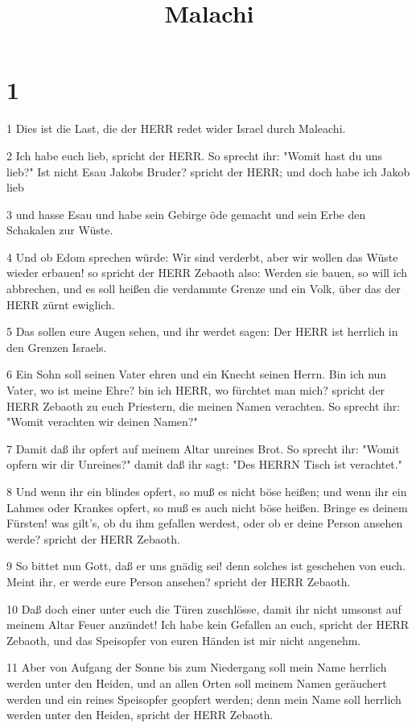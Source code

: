 

\title{Malachi}


\chapter{1}

\par 1 Dies ist die Last, die der HERR redet wider Israel durch Maleachi.
\par 2 Ich habe euch lieb, spricht der HERR. So sprecht ihr: "Womit hast du uns lieb?" Ist nicht Esau Jakobs Bruder? spricht der HERR; und doch habe ich Jakob lieb
\par 3 und hasse Esau und habe sein Gebirge öde gemacht und sein Erbe den Schakalen zur Wüste.
\par 4 Und ob Edom sprechen würde: Wir sind verderbt, aber wir wollen das Wüste wieder erbauen! so spricht der HERR Zebaoth also: Werden sie bauen, so will ich abbrechen, und es soll heißen die verdammte Grenze und ein Volk, über das der HERR zürnt ewiglich.
\par 5 Das sollen eure Augen sehen, und ihr werdet sagen: Der HERR ist herrlich in den Grenzen Israels.
\par 6 Ein Sohn soll seinen Vater ehren und ein Knecht seinen Herrn. Bin ich nun Vater, wo ist meine Ehre? bin ich HERR, wo fürchtet man mich? spricht der HERR Zebaoth zu euch Priestern, die meinen Namen verachten. So sprecht ihr: "Womit verachten wir deinen Namen?"
\par 7 Damit daß ihr opfert auf meinem Altar unreines Brot. So sprecht ihr: "Womit opfern wir dir Unreines?" damit daß ihr sagt: "Des HERRN Tisch ist verachtet."
\par 8 Und wenn ihr ein blindes opfert, so muß es nicht böse heißen; und wenn ihr ein Lahmes oder Krankes opfert, so muß es auch nicht böse heißen. Bringe es deinem Fürsten! was gilt's, ob du ihm gefallen werdest, oder ob er deine Person ansehen werde? spricht der HERR Zebaoth.
\par 9 So bittet nun Gott, daß er uns gnädig sei! denn solches ist geschehen von euch. Meint ihr, er werde eure Person ansehen? spricht der HERR Zebaoth.
\par 10 Daß doch einer unter euch die Türen zuschlösse, damit ihr nicht umsonst auf meinem Altar Feuer anzündet! Ich habe kein Gefallen an euch, spricht der HERR Zebaoth, und das Speisopfer von euren Händen ist mir nicht angenehm.
\par 11 Aber von Aufgang der Sonne bis zum Niedergang soll mein Name herrlich werden unter den Heiden, und an allen Orten soll meinem Namen geräuchert werden und ein reines Speisopfer geopfert werden; denn mein Name soll herrlich werden unter den Heiden, spricht der HERR Zebaoth.
